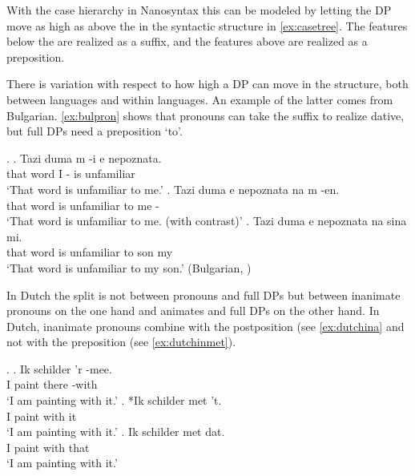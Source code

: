 \documentclass[12pt]{article}
\begin{document}
With the case hierarchy in Nanosyntax this can be modeled by letting the DP move as high as above the  in the syntactic structure in \ref{ex:casetree}. The features below the  are realized as a suffix, and the features above  are realized as a preposition.

There is variation with respect to how high a DP can move in the structure, both between languages and within languages. An example of the latter comes from Bulgarian. \ref{ex:bulpron} shows that pronouns can take the suffix  to realize dative, but full DPs need a preposition  `to'.


\ex.\label{ex:bulgarian}
\ag. Tazi duma m -i e nepoznata.\\
that word I - is unfamiliar\\
`That word is unfamiliar to me.'\label{ex:bulpron}
\bg. Tazi duma e nepoznata na m -en.\\
that word is unfamiliar to me -\\
`That word is unfamiliar to me. (with contrast)'
\bg. Tazi duma e nepoznata na sina mi.\\
that word is unfamiliar to son my\\
`That word is unfamiliar to my son.'\label{ex:buldpto} \hfill (Bulgarian, \citealt[39]{caha2009})

In Dutch the split is not between pronouns and full DPs but between inanimate pronouns on the one hand and animates and full DPs on the other hand. In Dutch, inanimate pronouns combine with the postposition  (see \ref{ex:dutchina} and not with the preposition  (see \ref{ex:dutchinmet}).


\ex.
\ag. Ik schilder 'r -mee.\\
 I paint there -with\\
 `I am painting with it.'\label{ex:dutchina}
\bg. *Ik schilder met 't.\\
 I paint with it\\
 `I am painting with it.'\label{ex:dutchinmet}
\bg. Ik schilder met dat.\\
 I paint with that\\
 `I am painting with it.'
\end{document}

